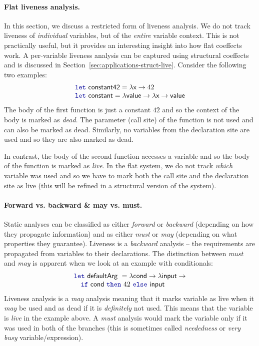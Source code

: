 \paragraph{Flat liveness analysis.}
In this section, we discuss a restricted form of liveness analysis. We do not track liveness of 
\emph{individual} variables, but of the \emph{entire} variable context. This is not practically
useful, but it provides an interesting insight into how flat coeffects work. A per-variable liveness
analysis can be captured using structural coeffects and is discussed in Section~\ref{sec:applications-struct-live}.
Consider the following two examples:
%
\begin{equation*}
\begin{array}{l}
\kvd{let}~\ident{constant42} = \lambda \ident{x} \rightarrow 42\\
\kvd{let}~\ident{constant} = \lambda \ident{value} \rightarrow \lambda \ident{x} \rightarrow \ident{value}
\end{array}
\end{equation*}
%
The body of the first function is just a constant $42$ and so the context of the body is marked
as \emph{dead}. The parameter (call site) of the function is not used and can also be marked as dead. 
Similarly, no variables from the declaration site are used and so they are also marked as dead.

In contrast, the body of the second function accesses a variable  and so the body 
of the function is marked as \emph{live}. In the flat system, we do not track \emph{which} 
variable was used and so we have to mark both the call site and the declaration site as live (this will
be refined in a structural version of the system).

\paragraph{Forward vs. backward \& may vs. must.}
Static analyses can be classified as either \emph{forward} or \emph{backward} (depending on how they 
propagate information) and as either \emph{must} or \emph{may} (depending on what properties they
guarantee). Liveness is a \emph{backward} analysis -- the requirements are propagated from variables 
to their declarations. The distinction between \emph{must} and \emph{may} is apparent when we look 
at an example with conditionals:
%
\begin{equation*}
\begin{array}{l}
\kvd{let}~\ident{defaultArg}~= \lambda \ident{cond} \rightarrow \lambda \ident{input} \rightarrow\\
\quad\kvd{if}~\ident{cond}~\kvd{then}~42~\kvd{else}~\ident{input}
\end{array}
\end{equation*}
%
Liveness analysis is a \emph{may} analysis meaning that it marks variable as live when it
\emph{may} be used and as dead if it is \emph{definitely} not used. This means that the variable
 is \emph{live} in the example above. A \emph{must} analysis would mark the variable
only if it was used in both of the branches (this is sometimes called \emph{neededness} or
\emph{very busy} variable/expression).

